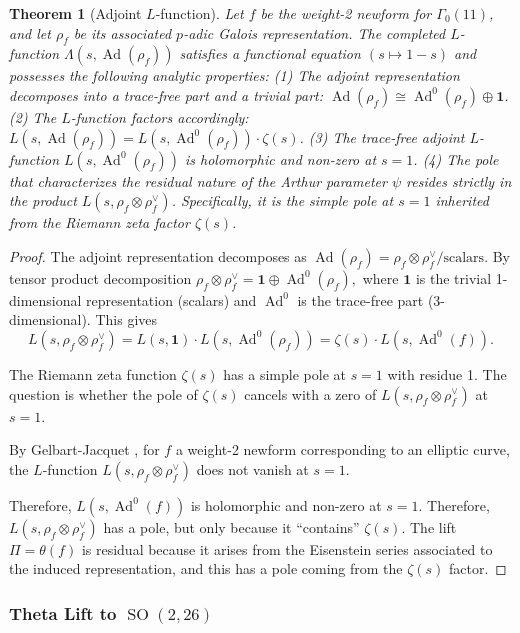 \documentclass[12pt]{amsart}
\newtheorem{theorem}{Theorem}[section]
\theoremstyle{definition}
\DeclareMathOperator\SO{SO}
\DeclareMathOperator\Ad{Ad}
\begin{document}
\begin{theorem}[Adjoint $L$-function]
Let $f$ be the weight-2 newform for $\Gamma_0(11)$, and let $\rho_f$ be its associated $p$-adic Galois representation. The completed $L$-function $\Lambda(s, \Ad(\rho_f))$ satisfies a functional equation $(s \mapsto 1-s)$ and possesses the following analytic properties: (1) The adjoint representation decomposes into a trace-free part and a trivial part: $\Ad(\rho_f) \cong \Ad^0(\rho_f) \oplus \mathbf{1}$. (2) The $L$-function factors accordingly: $L(s, \Ad(\rho_f)) = L(s, \Ad^0(\rho_f)) \cdot \zeta(s)$. (3) The trace-free adjoint $L$-function $L(s, \Ad^0(\rho_f))$ is holomorphic and non-zero at $s=1$. (4) The pole that characterizes the residual nature of the Arthur parameter $\psi$ resides strictly in the product $L(s, \rho_f \otimes \rho_f^\vee)$. Specifically, it is the simple pole at $s=1$ inherited from the Riemann zeta factor $\zeta(s)$.
\end{theorem}
\begin{proof}


The adjoint representation decomposes as
$\Ad(\rho_f) = \rho_f \otimes \rho_f^{\vee} / \text{scalars}.$ By tensor product decomposition $\rho_f \otimes \rho_f^{\vee} = \mathbf{1} \oplus \Ad^0(\rho_f),$ where $\mathbf{1}$ is the trivial 1-dimensional representation (scalars) and $\Ad^0$ is the trace-free part (3-dimensional). This gives
$$L(s, \rho_f \otimes \rho_f^{\vee}) = L(s, \mathbf{1}) \cdot L(s, \Ad^0(\rho_f)) = \zeta(s) \cdot L(s, \Ad^0(f)).$$

 

The Riemann zeta function $\zeta(s)$ has a simple pole at $s=1$ with residue 1.  The question is whether the pole of $\zeta(s)$ cancels with a zero of $L(s, \rho_f \otimes \rho_f^{\vee})$ at $s=1$.

By Gelbart-Jacquet \cite{Gelbart-Jacquet}, for $f$ a weight-2 newform corresponding to an elliptic curve, the $L$-function $L(s, \rho_f \otimes \rho_f^{\vee})$ does not vanish at $s=1$.

Therefore, $ L(s, \Ad^0(f))$ is holomorphic and non-zero at $s=1$. Therefore, $L(s, \rho_f \otimes \rho_f^{\vee})$ has a pole, but only because it ``contains'' $\zeta(s)$. The lift $\Pi = \theta(f)$ is residual because it arises from the Eisenstein series associated to the induced representation, and this has a pole coming from the $\zeta(s)$ factor.
\end{proof}

\subsubsection{Theta Lift to $\SO(2, 26)$}
\end{document}
